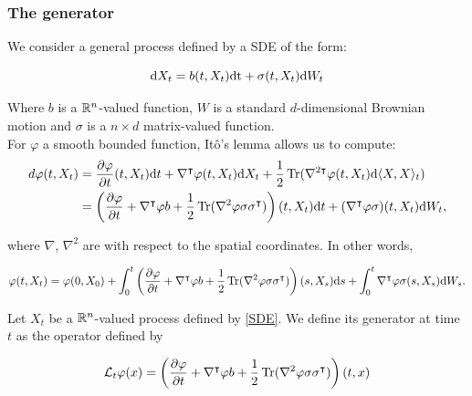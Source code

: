 \subsubsection{The generator}
We consider a general process defined by a SDE of the form:

\begin{equation}
    \label{SDE}
    \text dX_t=b(t,X_t)\text {\text{d}t} + \sigma(t,X_t)\text dW_t
\end{equation}

Where $b$ is a $\mathbb{R}^n$-valued function, $W$ is a standard $d$-dimensional Brownian motion and $\sigma$ is a $n\times d$ matrix-valued function.\\
For $\varphi$ a smooth bounded function, Itô's lemma allows us to compute:
\begin{align*}
    d\varphi(t,X_t) &=\frac{\partial \varphi}{\partial t}(t,X_t)\text dt + \nabla^\intercal \varphi(t,X_t) \text dX_t + \frac12 \operatorname{Tr}(\nabla^{2\intercal}\varphi(t,X_t)\text d\langle X ,X\rangle _t)\\
    &=\left( \frac{\partial \varphi}{\partial t} + \nabla^{\intercal}\varphi b + \frac12 \operatorname{Tr}(\nabla^2\varphi \sigma\sigma^\intercal) \right)(t,X_t) \text dt+ (\nabla^\intercal \varphi\sigma )(t,X_t)\text dW_t,
\end{align*}

where $\nabla$, $\nabla^2$ are with respect to the spatial coordinates. In other words,


\begin{equation}
    \label{Ito}
    \varphi(t,X_t)= \varphi(0,X_0)+\int_0^t\left( \frac{\partial \varphi}{\partial t} + \nabla^\intercal\varphi b + \frac12 \operatorname{Tr}(\nabla^2\varphi\sigma\sigma^\intercal) \right)(s,X_s) \text ds + \int_0^t\nabla^\intercal \varphi\sigma(s,X_s)\text dW_s.
\end{equation}

    \begin{definition}
        Let $X_t$ be a $\mathbb{R}^n$-valued process defined by \ref{SDE}. We define its generator at time $t$ as the operator defined by

        \begin{equation}
            \label{Generator}
            \mathcal{L}_t \varphi(x)=\left(\frac{\partial \varphi}{\partial t} + \nabla^\intercal\varphi b + \frac12 \operatorname{Tr}(\nabla^2\varphi \sigma\sigma^\intercal)\right)(t,x)
        \end{equation}

    \end{definition}

